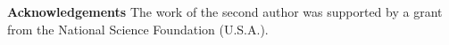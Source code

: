 \documentclass[12pt]{article}
\begin{document}
{\bf Acknowledgements}  The work of the second author was supported
by a grant from the National Science Foundation (U.S.A.).
\end{document}

